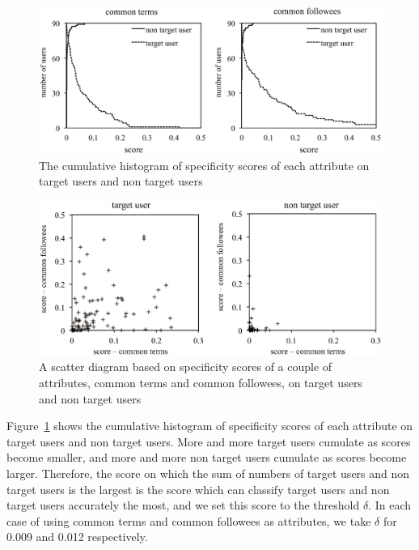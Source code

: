 {\footnotesize
\begin{figure}[t]
\begin{center}
\includegraphics[width=14cm]{images/cumulativehistogram.eps}
 \caption{The cumulative histogram of specificity scores of each
 attribute on target users and non target users}
\label{fig:cumulativehistogram}
\end{center}
\end{figure}
}

{\footnotesize
\begin{figure}[t]
\begin{center}
\includegraphics[width=14cm]{images/distribution.eps}
 \caption{A scatter diagram based on specificity scores of a couple of
 attributes, common terms and common followees, on target users and non
 target users}
\label{fig:distribution}
\end{center}
\end{figure}
}

Figure~\ref{fig:cumulativehistogram} shows the cumulative histogram of
specificity scores of each attribute on target users and non target
users.  More and more target users cumulate as scores become smaller,
and more and more non target users cumulate as scores become larger.
Therefore, the score on which the sum of numbers of target users and non
target users is the largest is the score which can classify target
users and non target users accurately the most, and we set this score
to the threshold $\delta$.  In each case of using common terms and
common followees as attributes, we take $\delta$ for 0.009 and 0.012
respectively.

